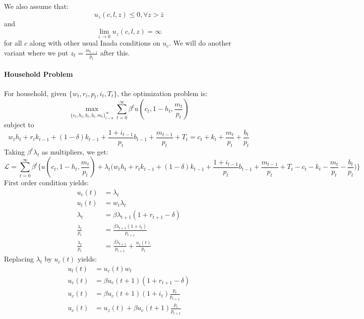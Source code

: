 \documentclass[12pt]{article}
\begin{document}
We also assume that:
\begin{equation}
	u_z(c, l, z)\leq 0, \forall z>\bar{z}
\end{equation}
and
\begin{equation}
	\lim_{z\rightarrow 0} u_z(c, l, z) = \infty
\end{equation}
for all $c$ along with other usual Inada conditions on $u_c$. We will do another variant where we put $z_t = \frac{m_{t-1}}{p_t}$ after this.

\paragraph{Household Problem}
For household, given $\{w_t, r_t, p_t, i_t , T_t\}$, the optimization problem is:
\begin{equation}
	\max_{\{c_t, h_t, k_t, b_t, m_t\}_{t=0}^\infty} \sum_{t=0}^\infty \beta^t u(c_t, 1-h_t, \frac{m_t}{p_t})
\end{equation}
subject to 
\begin{equation} \label{eq:miu_budget}
	w_th_t + r_t k_{t-1} + (1-\delta)k_{t-1} + \frac{1+i_{t-1}}{p_t}b_{t-1} + \frac{m_{t-1}}{p_t} + T_t = c_t + k_t + \frac{m_t}{p_t} + \frac{b_t}{p_t}
\end{equation}
Taking $\beta^t \lambda_t$ as multipliers, we get:
\begin{equation}
	\mathcal{L} = \sum_{t=0}^\infty \beta^t \Bigg\{u(c_t, 1-h_t, \frac{m_t}{p_t}) + \lambda_t \Big(w_th_t + r_t k_{t-1} + (1-\delta)k_{t-1} + \frac{1+i_{t-1}}{p_t}b_{t-1} + \frac{m_{t-1}}{p_t} + T_t - c_t - k_t - \frac{m_t}{p_t} - \frac{b_t}{p_t} \Big)\Bigg\}
\end{equation}
First order condition yields:
\begin{align}
	u_c(t) &= \lambda_t\\
	u_l(t) &= w_t \lambda_t\\
	\lambda_t &= \beta \lambda_{t+1}(1+r_{t+1} - \delta)\\
	\frac{\lambda_t}{p_t} &= \frac{\beta\lambda_{t+1}(1+i_t)}{p_{t+1}}\\
	\frac{\lambda_t}{p_t} &= \frac{\beta \lambda_{t+1}}{p_{t+1}} + \frac{u_z(t)}{p_t}
\end{align}
Replacing $\lambda_t$ by $u_c(t)$ yields:
\begin{align}
	u_l(t) &= u_c(t)w_t \label{eq:intra_miu}\\
	u_c(t) &= \beta u_c(t+1)(1+r_{t+1} - \delta) \label{eq:euler_k_miu}\\
	u_c(t) &= \beta u_c(t+1) (1+i_t) \frac{p_t}{p_{t+1}} \label{eq:euler_miu}\\
	u_c(t) &= u_z(t) + \beta u_c(t+1) \frac{p_t}{p_{t+1}} \label{eq:euler_money}
\end{align}
\end{document}
